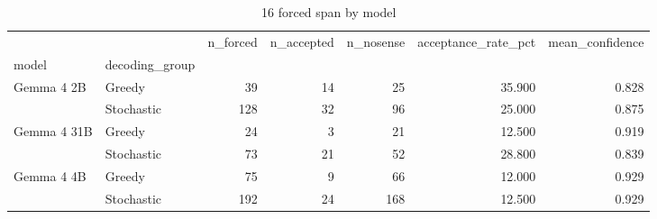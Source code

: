 \begin{table}
\caption{16 forced span by model}
\begin{tabular}{llrrrrr}
\toprule
 &  & n\_forced & n\_accepted & n\_nosense & acceptance\_rate\_pct & mean\_confidence \\
model & decoding_group &  &  &  &  &  \\
\midrule
\multirow[t]{2}{*}{Gemma 4 2B} & Greedy & 39 & 14 & 25 & 35.900 & 0.828 \\
 & Stochastic & 128 & 32 & 96 & 25.000 & 0.875 \\
\cline{1-7}
\multirow[t]{2}{*}{Gemma 4 31B} & Greedy & 24 & 3 & 21 & 12.500 & 0.919 \\
 & Stochastic & 73 & 21 & 52 & 28.800 & 0.839 \\
\cline{1-7}
\multirow[t]{2}{*}{Gemma 4 4B} & Greedy & 75 & 9 & 66 & 12.000 & 0.929 \\
 & Stochastic & 192 & 24 & 168 & 12.500 & 0.929 \\
\cline{1-7}
\bottomrule
\end{tabular}
\end{table}
